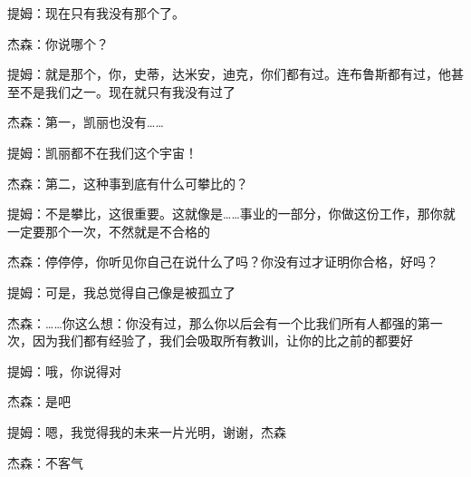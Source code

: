 提姆：现在只有我没有那个了。

杰森：你说哪个？

提姆：就是那个，你，史蒂，达米安，迪克，你们都有过。连布鲁斯都有过，他甚至不是我们之一。现在就只有我没有过了

杰森：第一，凯丽也没有……

提姆：凯丽都不在我们这个宇宙！

杰森：第二，这种事到底有什么可攀比的？

提姆：不是攀比，这很重要。这就像是……事业的一部分，你做这份工作，那你就一定要那个一次，不然就是不合格的

杰森：停停停，你听见你自己在说什么了吗？你没有过才证明你合格，好吗？

提姆：可是，我总觉得自己像是被孤立了

杰森：……你这么想：你没有过，那么你以后会有一个比我们所有人都强的第一次，因为我们都有经验了，我们会吸取所有教训，让你的比之前的都要好

提姆：哦，你说得对

杰森：是吧

提姆：嗯，我觉得我的未来一片光明，谢谢，杰森

杰森：不客气

~\

